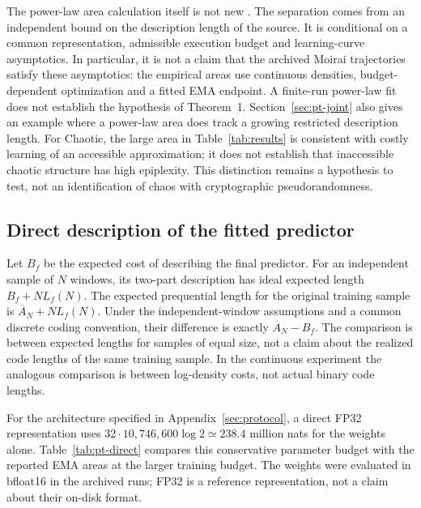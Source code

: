 \documentclass[10pt,a4paper]{article}
\theoremstyle{definition}
\begin{document}
The power-law area calculation itself is not new
\cite[Section~6.3 and Appendix~B]{finzi2026}. The separation comes
from an independent bound on the description length of the source.
It is conditional on a common representation, admissible execution
budget and learning-curve asymptotics. In particular, it is not a
claim that the archived Moirai trajectories satisfy these asymptotics:
the empirical areas use continuous densities, budget-dependent
optimization and a fitted EMA endpoint. A finite-run power-law fit
does not establish the hypothesis of Theorem~1. Section~\ref{sec:pt-joint}
also gives an example where a power-law area does track a growing
restricted description length. For Chaotic, the large area in
Table~\ref{tab:results} is consistent with costly learning of an
accessible approximation; it does not establish that inaccessible
chaotic structure has high epiplexity. This distinction remains a
hypothesis to test, not an identification of chaos with cryptographic
pseudorandomness.

\subsection{Direct description of the fitted predictor}
\label{sec:pt-direct}

Let $B_f$ be the expected cost of describing the final predictor.
For an independent sample of $N$ windows, its two-part description
has ideal expected length $B_f+NL_f(N)$. The expected prequential
length for the original training sample is $\overline A_N+NL_f(N)$.
Under the independent-window assumptions and a common discrete
coding convention, their difference is exactly $\overline A_N-B_f$.
The comparison is between expected lengths for samples of equal size,
not a claim about the realized code lengths of the same training
sample. In the continuous experiment the analogous comparison is
between log-density costs, not actual binary code lengths.

For the architecture specified in Appendix~\ref{sec:protocol}, a
direct FP32 representation uses
$32\cdot10{,}746{,}600\log 2\simeq238.4$ million nats for the weights
alone. Table~\ref{tab:pt-direct} compares this conservative parameter
budget with the reported EMA areas at the larger training budget.
The weights were evaluated in bfloat16 in the archived runs; FP32
is a reference representation, not a claim about their on-disk format.
\end{document}
